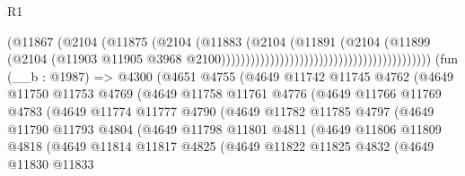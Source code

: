 \begin{lexlean}{R1}
\begin{coremodule}
                                                                    (@11867
                                                                      (@2104
                                                                        (@11875
                                                                          (@2104
                                                                            (@11883
                                                                              (@2104
                                                                                (@11891
                                                                                  (@2104
                                                                                    (@11899
                                                                                      (@2104
                                                                                        (@11903
                                                                                          @11905
                                                                                          @3968
                                                                                          @2100)))))))))))))))))))))))))))))))))))))))))))
    (fun (__b : @1987) =>
    @4300
      (@4651
        @4755
        (@4649
          @11742
          @11745
          @4762
          (@4649
            @11750
            @11753
            @4769
            (@4649
              @11758
              @11761
              @4776
              (@4649
                @11766
                @11769
                @4783
                (@4649
                  @11774
                  @11777
                  @4790
                  (@4649
                    @11782
                    @11785
                    @4797
                    (@4649
                      @11790
                      @11793
                      @4804
                      (@4649
                        @11798
                        @11801
                        @4811
                        (@4649
                          @11806
                          @11809
                          @4818
                          (@4649
                            @11814
                            @11817
                            @4825
                            (@4649
                              @11822
                              @11825
                              @4832
                              (@4649
                                @11830
                                @11833

\end{coremodule}
\end{lexlean}
